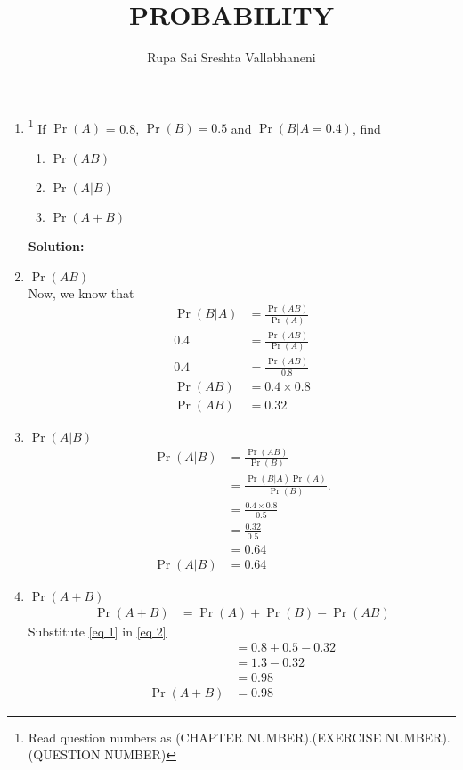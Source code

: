 \documentclass{article}
\newcommand{\solution}{\noindent \textbf{Solution: }}
\providecommand{\pr}[1]{\ensuremath{\Pr\left(#1\right)}}
\begin{document}
\title{PROBABILITY}
\author{\Large Rupa Sai Sreshta Vallabhaneni}
\date{}

\maketitle
\begin{enumerate}[label=13.\arabic{enumi}.\arabic{enumii}]%
\setcounter{enumi}{0}
\setcounter{enumii}{3}

\item \footnote{Read question numbers as (CHAPTER NUMBER).(EXERCISE NUMBER).(QUESTION NUMBER)}  If $\pr{A}$ = 0.8, $\pr{B} = 0.5$ and $\pr{B \vert A = 0.4}$, find  
\begin{enumerate}
\item
$\pr{AB}$ 
\item
 $\pr{A \vert B}$
\item
 $\pr{A+B}$
\end{enumerate}


\solution
\item $\pr{AB}$
 \\
  Now, we know that
 \begin{align}
\pr{B \vert A} &= \frac{\pr{AB}}{\pr{A}}
 \\
 0.4 &= \frac{\pr{AB}}{\pr{A}}
 \\
 0.4 &= \frac{\pr{AB}}{0.8}
 \\
 \pr{AB} &= 0.4 \times 0.8
 \\
 \pr{AB} &= 0.32
 \label{eq 1}
 \end{align}
 \item
 $\pr{A \vert B}$
 \begin{align}
 \pr{A \vert B} &= \frac{\pr{AB}}{\pr{B}}
 \\
 &= \frac{\pr{ B \vert A}\pr{A}}{\pr{B}}.
 \\
  &= \frac{0.4 \times 0.8}{0.5}
 \\
 &= \frac{0.32}{0.5}
 \\
 &= 0.64
 \\
\pr{A \vert B} &= 0.64
 \end{align}
 \item
  $\pr{A+B}$
 \begin{align}
 \pr{A+B} &= \pr{A}+\pr{B}-\pr{AB} 
 \label{eq 2}
 \end{align}
 Substitute \eqref{eq 1}  in \eqref{eq 2}
 \begin{align}
 &=0.8+0.5-0.32
 \\
 &=1.3-0.32
 \\
 &= 0.98
 \\
 \pr{A+B} &= 0.98
 \end{align}
\end{enumerate}
\end{document}
